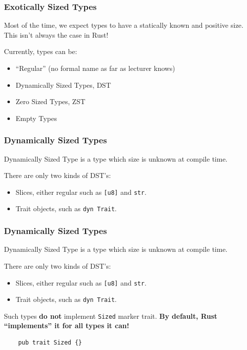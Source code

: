 \documentclass[aspectratio=1610,t]{beamer}
\begin{document}

\begin{frame}[fragile]
\frametitle{Exotically Sized Types}
Most of the time, we expect types to have a statically known and positive size. This isn't always the case in Rust!

Currently, types can be:

\begin{itemize}
    \item ``Regular'' (no formal name as far as lecturer knows)
    \item Dynamically Sized Types, DST
    \item Zero Sized Types, ZST
    \item Empty Types
\end{itemize}
\end{frame}


\begin{frame}[fragile]
\frametitle{Dynamically Sized Types}
Dynamically Sized Type is a type which size is unknown at compile time.

There are only two kinds of DST's:

\begin{itemize}
    \item Slices, either regular such as \texttt{[u8]} and \texttt{str}.
    \item Trait objects, such as \texttt{dyn Trait}.
\end{itemize}
\end{frame}


\begin{frame}[fragile]
\frametitle{Dynamically Sized Types}
Dynamically Sized Type is a type which size is unknown at compile time.

There are only two kinds of DST's:

\begin{itemize}
    \item Slices, either regular such as \texttt{[u8]} and \texttt{str}.
    \item Trait objects, such as \texttt{dyn Trait}.
\end{itemize}

Such types \textbf{do not} implement \texttt{Sized} marker trait. \textbf{By default, Rust ``implements'' it for all types it can!}

\begin{verbatim}
    pub trait Sized {}
\end{verbatim}
\end{frame}
\end{document}
